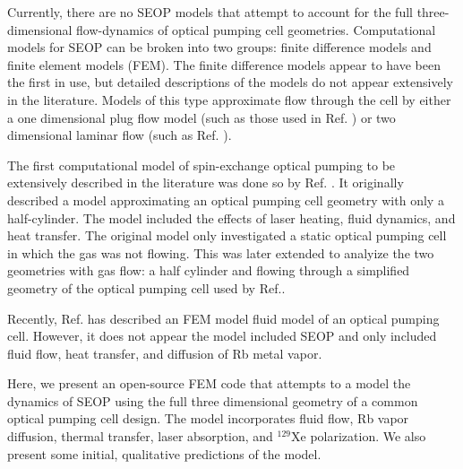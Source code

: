 Currently, there are no SEOP models that attempt to account for the full three-dimensional flow-dynamics of optical pumping cell geometries. Computational models for SEOP can be broken into two groups: finite difference models and finite element models (FEM). The finite difference models appear to have been the first in use, but detailed descriptions of the models do not appear extensively in the literature. Models of this type approximate flow through the cell by either a one dimensional plug flow model (such as those used in Ref. \cite{Freeman2014}) or two dimensional laminar flow (such as Ref. \cite{Ruset2005}). 

The first computational model of spin-exchange optical pumping to be extensively described in the literature was done so by Ref. \cite{Fink2005}. It originally described a model approximating an optical pumping cell geometry with only a half-cylinder. The model included the effects of laser heating, fluid dynamics, and heat transfer. The original model only investigated a static optical pumping cell in which the gas was not flowing. This was later extended to analyize the two geometries with gas flow: a half cylinder and flowing through a simplified geometry of the optical pumping cell used by Ref.\cite{Ruset2006Optical129Xe}.

Recently, Ref. \cite{Burant2018CHARACTERIZINGCONTRAST} has described an FEM model fluid model of an optical pumping cell. However, it does not appear the model included SEOP and only included fluid flow, heat transfer, and diffusion of Rb metal vapor. 

Here, we present an open-source FEM code that attempts to a model the dynamics of SEOP using the full three dimensional geometry of a common optical pumping cell design. The model incorporates fluid flow, Rb vapor diffusion, thermal transfer, laser absorption, and $^{129}$Xe polarization. We also present some initial, qualitative predictions of the model. 